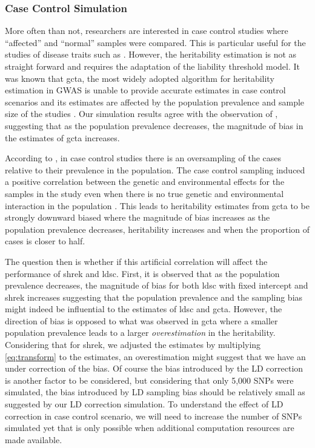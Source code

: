 \documentclass[12pt]{scrbook}
\newcommand*{\glng}{\glsentrylong}
\begin{document}
\subsubsection{Case Control Simulation}
More often than not, researchers are interested in case control studies where ``affected'' and ``normal'' samples were compared. 
This is particular useful for the studies of disease traits such as \glng{scz}.
However, the heritability estimation is not as straight forward and requires the adaptation of the liability threshold model.
It was known that \gls{gcta}, the most widely adopted algorithm for heritability estimation in \gls{GWAS} is unable to provide accurate estimates in case control scenarios and its estimates are affected by the population prevalence and sample size of the studies \citep{Golan2014}.
Our simulation results agree with the observation of \citet{Golan2014}, suggesting that as the population prevalence decreases, the magnitude of bias in the estimates of \gls{gcta} increases.

According to \citet{Golan2014}, in case control studies there is an oversampling of the cases relative to their prevalence in the population.
The case control sampling induced a positive correlation between the genetic and environmental effects for the samples in the study even when there is no true genetic and environmental interaction in the population \citep{Golan2014}.
This leads to heritability estimates from \gls{gcta} to be strongly downward biased where the magnitude of bias increases as the population prevalence decreases, heritability increases and when the proportion of cases is closer to half.

The question then is whether if this artificial correlation will affect the performance of \gls{shrek} and \gls{ldsc}.
First, it is observed that as the population prevalence decreases, the magnitude of bias for both \gls{ldsc} with fixed intercept and \gls{shrek} increases suggesting that the population prevalence and the sampling bias might indeed be influential to the estimates of \gls{ldsc} and \gls{gcta}.
However, the direction of bias is opposed to what was observed in \gls{gcta} where a smaller population prevalence leads to a larger \emph{overestimation} in the heritability.
Considering that for \gls{shrek}, we adjusted the estimates by multiplying \cref{eq:transform} to the estimates, an overestimation might suggest that we have an under correction of the bias. 
Of course the bias introduced by the \gls{LD} correction is another factor to be considered, but considering that only 5,000 \glspl{SNP} were simulated, the bias introduced by \gls{LD} sampling bias should be relatively small as suggested by our \gls{LD} correction simulation.
To understand the effect of \gls{LD} correction in case control scenario, we will need to increase the number of \glspl{SNP} simulated yet that is only possible when additional computation resources are made available.
\end{document}
